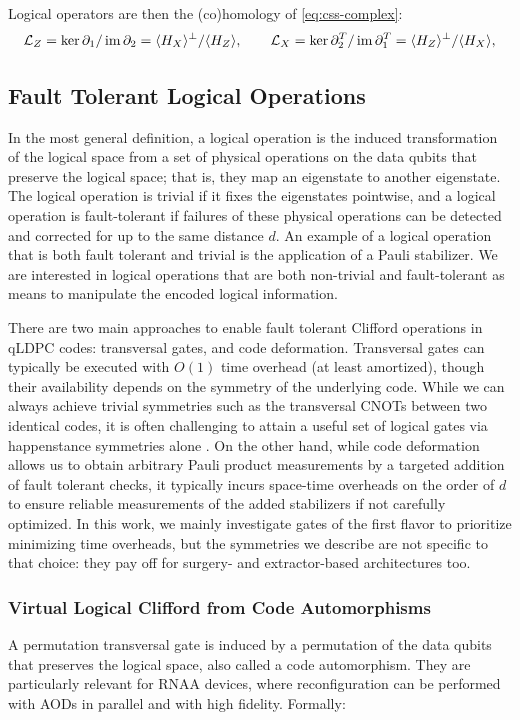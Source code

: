 Logical operators are then the (co)homology of \eqref{eq:css-complex}:
\begin{equation}
    \mathcal L_Z = \ker \partial_1/\operatorname{im}\partial_2 = \langle H_X \rangle^\perp/\langle H_Z \rangle,
    \qquad
    \mathcal L_X = \ker \partial_2^{T}/\operatorname{im}\partial_1^{T} = \langle H_Z \rangle^\perp/\langle H_X \rangle,
\end{equation}

\subsection{Fault Tolerant Logical Operations}\label{ssec:ft-logic}
In the most general definition, a logical operation is the induced transformation of the logical space from a set of physical operations on the data qubits that preserve the logical space; that is, they map an eigenstate to another eigenstate. The logical operation is trivial if it fixes the eigenstates pointwise, and a logical operation is fault-tolerant if failures of these physical operations can be detected and corrected for up to the same distance $d$. An example of a logical operation that is both fault tolerant and trivial is the application of a Pauli stabilizer. We are interested in logical operations that are both non-trivial and fault-tolerant as means to manipulate the encoded logical information. 

There are two main approaches to enable fault tolerant Clifford operations in qLDPC codes: transversal gates, and code deformation. Transversal gates can typically be executed with $O(1)$ time overhead (at least amortized), though their availability depends on the symmetry of the underlying code. While we can always achieve trivial symmetries such as the transversal CNOTs between two identical codes, it is often challenging to attain a useful set of logical gates via happenstance symmetries alone \cite{yang2026spacetimeefficienthardwarecompatiblecomplexquantum}. On the other hand, while code deformation allows us to obtain arbitrary Pauli product measurements by a targeted addition of fault tolerant checks, it typically incurs space-time overheads on the order of $d$ to ensure reliable measurements of the added stabilizers if not carefully optimized. In this work, we mainly investigate gates of the first flavor to prioritize minimizing time overheads, but the symmetries we describe are not specific to that choice: they pay off for surgery- and extractor-based architectures too. 


\subsubsection{Virtual Logical Clifford from Code Automorphisms}
A permutation transversal gate is induced by a permutation of the data qubits that preserves the logical space, also called a code automorphism. They are particularly relevant for RNAA devices, where reconfiguration can be performed with AODs in parallel and with high fidelity. Formally:

